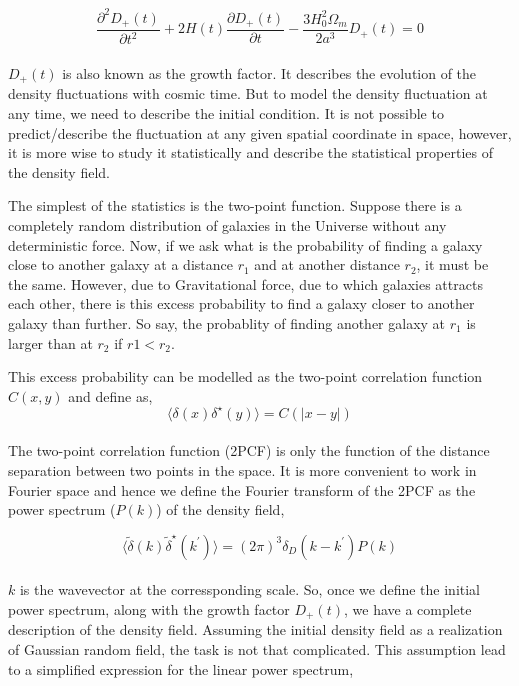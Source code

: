 \begin{equation}
	\dfrac{\partial^2 D_+(t)}{\partial t^2} + 2 H(t)
		\dfrac{\partial D_+(t)}{\partial t}
		- \dfrac{3H_0^2 \Omega_m}{2a^3} D_+(t) = 0
\end{equation}
\\
$D_+(t)$ is also known as the growth factor. It describes the evolution of the
density fluctuations with cosmic time. But to model the density fluctuation 
at any time, we need to describe the initial condition. It is not possible
to predict/describe the fluctuation at any given spatial coordinate in space,
however, it is more wise to study it statistically and describe the statistical
properties of the density field. 

The simplest of the statistics is the two-point function. Suppose there is a 
completely random distribution of galaxies in the Universe without any deterministic 
force. Now, if we ask what is the probability of finding a galaxy close to another
galaxy at a distance $r_1$ and at another distance $r_2$, it must be the same. 
However, due to Gravitational force, due to which galaxies attracts each other, 
there is this excess probability to find a galaxy closer to another galaxy than
further. So say, the probablity of finding another galaxy at $r_1$ is larger than
at $r_2$ if $r1<r_2$.

This excess probability can be modelled as the two-point correlation function $C(x,y)$ and define as, 
\begin{equation}
	\langle \delta(x) \delta^{\star}(y) \rangle = C(|x-y|)
\end{equation}
\\
The two-point correlation function (2PCF) is only the function of the distance
separation between two points in the space. It is more convenient to work in 
Fourier space and hence we define the Fourier transform of the 2PCF as the 
power spectrum ($P(k)$) of the density field,

\begin{equation}
		\langle \tilde{\delta}(k) \tilde{\delta}^{\star}(k^{\prime}) \rangle = 
				(2\pi)^3 \delta_D(k-k^{\prime}) P(k)
\end{equation}
\\
$k$ is the wavevector at the corressponding scale. So, once we define the initial
power spectrum, along with the growth factor $D_+(t)$, we have a complete description
of the density field. Assuming the initial density field as a realization of Gaussian
random field, the task is not that complicated. This assumption lead to a simplified
expression for the linear power spectrum,

